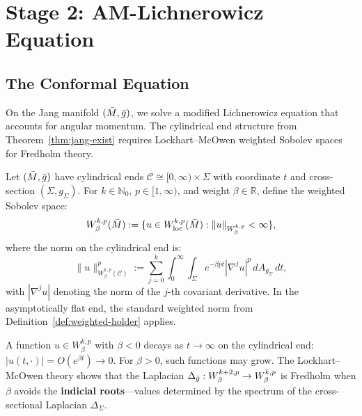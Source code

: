 \section{Stage 2: AM-Lichnerowicz Equation}\label{sec:lichnerowicz}

\subsection{The Conformal Equation}

On the Jang manifold $(\bar{M}, \bar{g})$, we solve a modified Lichnerowicz equation that accounts for angular momentum. The cylindrical end structure from Theorem~\ref{thm:jang-exist} requires Lockhart--McOwen weighted Sobolev spaces for Fredholm theory.

\begin{definition}\label{def:weighted-sobolev-cyl}
Let $(\bar{M}, \bar{g})$ have cylindrical ends $\mathcal{C} \cong [0,\infty) \times \Sigma$ with coordinate $t$ and cross-section $(\Sigma, g_\Sigma)$. For $k \in \mathbb{N}_0$, $p \in [1,\infty)$, and weight $\beta \in \mathbb{R}$, define the weighted Sobolev space:
\[
W^{k,p}_\beta(\bar{M}) := \{u \in W^{k,p}_{\mathrm{loc}}(\bar{M}) : \|u\|_{W^{k,p}_\beta} < \infty\},
\]
where the norm on the cylindrical end is:
\[
\|u\|_{W^{k,p}_\beta(\mathcal{C})}^p := \sum_{j=0}^{k} \int_0^\infty \int_\Sigma e^{-\beta p t} |\nabla^j u|^p \, dA_{g_\Sigma} \, dt,
\]
with $|\nabla^j u|$ denoting the norm of the $j$-th covariant derivative. In the asymptotically flat end, the standard weighted norm from Definition~\ref{def:weighted-holder} applies.

A function $u \in W^{k,p}_\beta$ with $\beta < 0$ decays as $t \to \infty$ on the cylindrical end: $|u(t, \cdot)| = O(e^{\beta t}) \to 0$. For $\beta > 0$, such functions may grow. The Lockhart--McOwen theory \cite{lockhartmccowen1985} shows that the Laplacian $\Delta_{\bar{g}}: W^{k+2,p}_\beta \to W^{k,p}_\beta$ is Fredholm when $\beta$ avoids the \textbf{indicial roots}---values determined by the spectrum of the cross-sectional Laplacian $\Delta_\Sigma$.
\end{definition}

